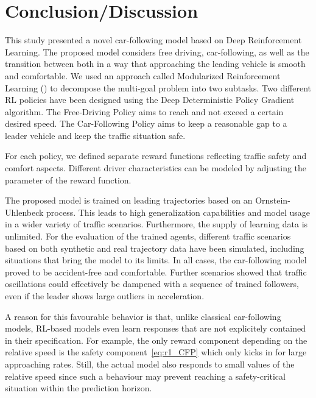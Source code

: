 \documentclass[review]{elsarticle}
\providecommand{\martin}[1]{#1}                  %
\providecommand{\martinc}[1]{}                  %
\providecommand{\3}{{\ss}}
\begin{document}
	\section{Conclusion/Discussion}
	\label{sec:conclusion}
	This study presented a novel car-following model based on
	Deep Reinforcement Learning. \martinc{Die Conclusion wird
		bisweilen separat gelesen, so besser (wie immer im Abstract) keine
		Abk\"urzungen verwenden, au\3er die allergebr\"auchlichsten} The
	proposed model considers free driving, car-following, as well as the
	transition between both in a way that approaching the leading vehicle
	is smooth and comfortable. We used an approach called Modularized
	Reinforcement Learning (\cite{MRL}) to decompose the multi-goal
	problem into two subtasks. Two different RL policies have been
	designed using the Deep Deterministic Policy Gradient algorithm. The
	Free-Driving Policy aims to reach and not exceed a certain
	desired speed. The Car-Following Policy aims to keep a reasonable gap
	to a leader vehicle and keep the traffic situation safe. 
	
	For each policy, we defined separate reward functions reflecting traffic safety and comfort aspects. 
	Different driver characteristics can be modeled by adjusting the parameter of the reward function.
	
	The proposed model is trained on leading trajectories based on an
	Ornstein-Uhlenbeck process. This leads to high generalization capabilities and model usage in a wider variety of traffic scenarios. Furthermore, the
	supply of learning data is unlimited.
	For the evaluation of the trained agents, different traffic scenarios
	based on both synthetic and
	real trajectory data have been simulated, including situations that
	bring the model to its limits. 
	In all cases, the car-following model proved to be accident-free and
	comfortable. Further scenarios showed that traffic oscillations could
	effectively be dampened with a sequence of trained followers, even if
	the leader shows large outliers in acceleration.

        \martin{A reason for this favourable behavior is that, unlike
        classical car-following models, RL-based models
        even learn responses that are not explicitely contained in their
        specification. For example, the only reward component depending on
        the relative speed is the safety component~\eqref{eq:r1_CFP}
        which only kicks in for large approaching rates. Still, the
        actual model also responds to small values of the relative
        speed since such a behaviour may prevent reaching a
        safety-critical situation within the prediction horizon.}
	
\end{document}
